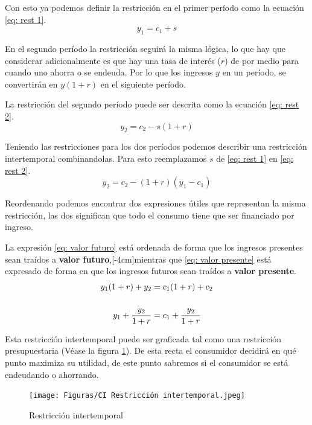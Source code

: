 Con esto ya podemos definir la restricción en el primer período como la ecuación \ref{eq: rest 1}.
\begin{equation}
    y_1 = c_1+s \label{eq: rest 1}
\end{equation}

En el segundo período la restricción seguirá la misma lógica, lo que hay que considerar adicionalmente es que hay una tasa de interés ($r$) de por medio para cuando uno ahorra o se endeuda. Por lo que los ingresos $y$ en un período, se convertirán en $y(1+r)$ en el siguiente período.

La restricción del segundo período puede ser descrita como la ecuación \ref{eq: rest 2}.
\begin{equation}
    y_2 = c_2 - s(1+r) \label{eq: rest 2}
\end{equation}

Teniendo las restricciones para los dos períodos podemos describir una restricción intertemporal combinandolas. Para esto reemplazamos $s$ de \ref{eq: rest 1} en \ref{eq: rest 2}.
\begin{equation*}
    y_2 = c_2 - (1+r)(y_1-c_1) 
\end{equation*}

Reordenando podemos encontrar dos expresiones útiles que representan la misma restricción, las dos significan que todo el consumo tiene que ser financiado por ingreso. 

La expresión \ref{eq: valor futuro} está ordenada de forma que los ingresos presentes sean traídos a \textbf{valor futuro},[-4cm]mientras que \ref{eq: valor presente} está expresado de forma en que los ingresos futuros sean traídos a \textbf{valor presente}.
\begin{align}
    y_1(1+r) + y_2 &= c_1(1+r) + c_2 \label{eq: valor futuro} \\
    \quad & \quad \notag\\
    y_1 + \frac{y_2}{1+r} &= c_1 + \frac{y_2}{1+r} \label{eq: valor presente}
\end{align}

Esta restricción intertemporal puede ser graficada tal como una restricción presupuestaria (Véase la figura \ref{fig: restricción intertemporal}). De esta recta el consumidor decidirá en qué punto maximiza su utilidad, de este punto sabremos si el consumidor se está endeudando o ahorrando. 
\begin{figure}
    \centering
    \caption{Restricción intertemporal}
    \texttt{[image: Figuras/CI Restricción intertemporal.jpeg]}
    \label{fig: restricción intertemporal}
\end{figure}

